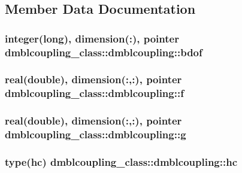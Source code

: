 \subsection{Member Data Documentation}
\hypertarget{structdmblcoupling__class_1_1dmblcoupling_af46ed740fbaeb310adfb63d24c789686}{
\subsubsection[{bdof}]{\setlength{\rightskip}{0pt plus 5cm}integer(long), dimension(\+:), pointer dmblcoupling\+\_\+class\+::dmblcoupling\+::bdof\hspace{0.3cm}{\ttfamily [private]}}}\label{structdmblcoupling__class_1_1dmblcoupling_af46ed740fbaeb310adfb63d24c789686}
\hypertarget{structdmblcoupling__class_1_1dmblcoupling_adf77a7cf987910e98f8f368406a8257f}{
\subsubsection[{f}]{\setlength{\rightskip}{0pt plus 5cm}real(double), dimension(\+:,\+:), pointer dmblcoupling\+\_\+class\+::dmblcoupling\+::f\hspace{0.3cm}{\ttfamily [private]}}}\label{structdmblcoupling__class_1_1dmblcoupling_adf77a7cf987910e98f8f368406a8257f}
\hypertarget{structdmblcoupling__class_1_1dmblcoupling_ac53af7cb58835be9fb0c569ecfa1c25e}{
\subsubsection[{g}]{\setlength{\rightskip}{0pt plus 5cm}real(double), dimension(\+:,\+:), pointer dmblcoupling\+\_\+class\+::dmblcoupling\+::g\hspace{0.3cm}{\ttfamily [private]}}}\label{structdmblcoupling__class_1_1dmblcoupling_ac53af7cb58835be9fb0c569ecfa1c25e}
\hypertarget{structdmblcoupling__class_1_1dmblcoupling_acdf924bcf32d4a331ae9d534f789aacf}{
\subsubsection[{hc}]{\setlength{\rightskip}{0pt plus 5cm}type(hc) dmblcoupling\+\_\+class\+::dmblcoupling\+::hc\hspace{0.3cm}{\ttfamily [private]}}}\label{structdmblcoupling__class_1_1dmblcoupling_acdf924bcf32d4a331ae9d534f789aacf}
